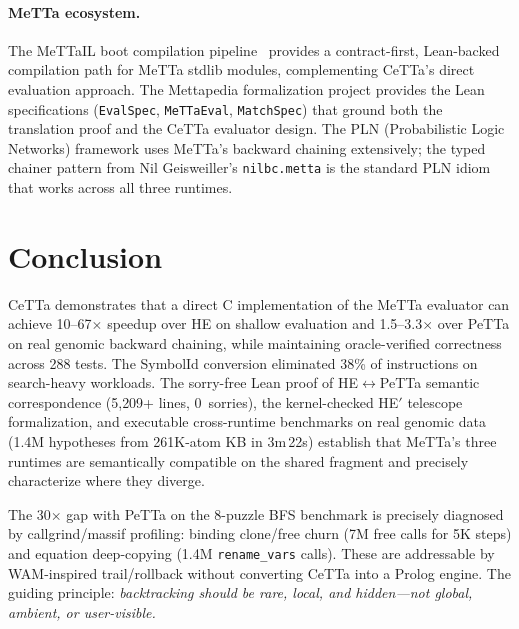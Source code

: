 \documentclass[11pt]{article}
\newcommand{\code}[1]{\texttt{#1}}
\newcommand{\PeTTa}{\textup{PeTTa}}
\newcommand{\HE}{\textup{HE}}
\newcommand{\CeTTa}{\textup{CeTTa}}
\begin{document}
\paragraph{MeTTa ecosystem.}
The MeTTaIL boot compilation pipeline~\cite{mettail} provides a
contract-first, Lean-backed compilation path for MeTTa stdlib modules,
complementing \CeTTa{}'s direct evaluation approach.  The Mettapedia
formalization project provides the Lean specifications (\code{EvalSpec},
\code{MeTTaEval}, \code{MatchSpec}) that ground both the translation
proof and the \CeTTa{} evaluator design.  The PLN (Probabilistic Logic
Networks) framework uses MeTTa's backward chaining extensively; the
typed chainer pattern from Nil Geisweiller's \code{nilbc.metta} is
the standard PLN idiom that works across all three runtimes.

\section{Conclusion}

\CeTTa{} demonstrates that a direct C implementation of the MeTTa
evaluator can achieve 10--67$\times$ speedup over \HE{} on shallow
evaluation and 1.5--3.3$\times$ over \PeTTa{} on real genomic backward
chaining, while maintaining oracle-verified correctness across 288 tests.
The SymbolId conversion eliminated 38\% of instructions on
search-heavy workloads.  The sorry-free Lean proof of
\HE{}$\leftrightarrow$\PeTTa{} semantic correspondence (5{,}209+ lines,
0~sorries), the kernel-checked HE$'$ telescope formalization, and
executable cross-runtime benchmarks on real genomic data
(1.4M hypotheses from 261K-atom KB in 3m\,22s) establish that
MeTTa's three runtimes are semantically compatible on the shared
fragment and precisely characterize where they diverge.

The 30$\times$ gap with \PeTTa{} on the 8-puzzle BFS benchmark
is precisely diagnosed by callgrind/massif profiling: binding
clone/free churn (7M free calls for 5K steps) and equation
deep-copying (1.4M \code{rename\_vars} calls).  These are
addressable by WAM-inspired trail/rollback without converting
\CeTTa{} into a Prolog engine.  The guiding principle:
\emph{backtracking should be rare, local, and hidden---not global,
ambient, or user-visible.}
\end{document}
